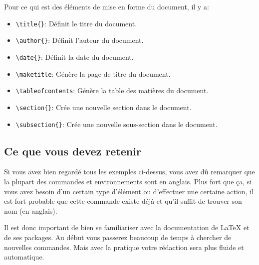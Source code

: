 Pour ce qui est des éléments de mise en forme du document, il y a:

\begin{itemize}
    \item \texttt{\textbackslash{}title\{\}}: Définit le titre du document.
    \item \texttt{\textbackslash{}author\{\}}: Définit l'auteur du document.
    \item \texttt{\textbackslash{}date\{\}}: Définit la date du document.
    \item \texttt{\textbackslash{}maketitle}: Génère la page de titre du document.
    \item \texttt{\textbackslash{}tableofcontents}: Génère la table des matières du document.
    \item \texttt{\textbackslash{}section\{\}}: Crée une nouvelle section dans le document.
    \item \texttt{\textbackslash{}subsection\{\}}: Crée une nouvelle sous-section dans le document.
\end{itemize}

\subsection{Ce que vous devez retenir}\label{subsec:latex_what_to_remember}

Si vous avez bien regardé tous les exemples ci-dessus, vous avez dû remarquer que
la plupart des commandes et environnements sont en anglais. Plus fort que ça,
si vous avez besoin d'un certain type d'élément ou d'effectuer une certaine action,
il est fort probable que cette commande existe déjà et qu'il suffit de trouver son nom (en anglais).

Il est donc important de bien se familiariser avec la documentation de LaTeX et de ses packages.
Au début vous passerez beaucoup de temps à chercher de nouvelles commandes. Mais avec la pratique votre rédaction sera plus fluide et automatique.